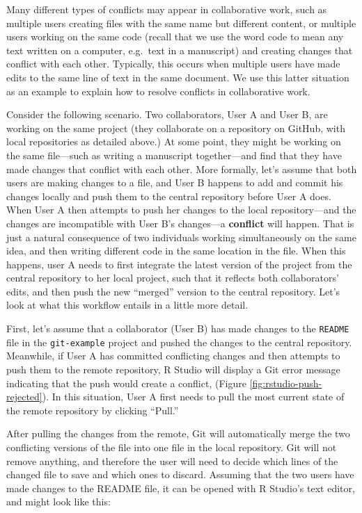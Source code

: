 \documentclass[
  american,
  ,doc,floatsintext]{apa6}
\begin{document}
Many different types of conflicts may appear in collaborative work, such as multiple users creating files with the same name but different content, or multiple users working on the same code (recall that we use the word code to mean any text written on a computer, e.g.~text in a manuscript) and creating changes that conflict with each other. Typically, this occurs when multiple users have made edits to the same line of text in the same document. We use this latter situation as an example to explain how to resolve conflicts in collaborative work.

Consider the following scenario. Two collaborators, User A and User B, are working on the same project (they collaborate on a repository on GitHub, with local repositories as detailed above.) At some point, they might be working on the same file---such as writing a manuscript together---and find that they have made changes that conflict with each other. More formally, let's assume that both users are making changes to a file, and User B happens to add and commit his changes locally and push them to the central repository before User A does. When User A then attempts to push her changes to the local repository---and the changes are incompatible with User B's changes---a \textbf{conflict} will happen. That is just a natural consequence of two individuals working simultaneously on the same idea, and then writing different code in the same location in the file. When this happens, user A needs to first integrate the latest version of the project from the central repository to her local project, such that it reflects both collaborators' edits, and then push the new ``merged'' version to the central repository. Let's look at what this workflow entails in a little more detail.

First, let's assume that a collaborator (User B) has made changes to the \texttt{README} file in the \texttt{git-example} project and pushed the changes to the central repository. Meanwhile, if User A has committed conflicting changes and then attempts to push them to the remote repository, R Studio will display a Git error message indicating that the push would create a conflict, (Figure \ref{fig:rstudio-push-rejected}). In this situation, User A first needs to pull the most current state of the remote repository by clicking ``Pull.''

After pulling the changes from the remote, Git will automatically merge the two conflicting versions of the file into one file in the local repository. Git will not remove anything, and therefore the user will need to decide which lines of the changed file to save and which ones to discard. Assuming that the two users have made changes to the README file, it can be opened with R Studio's text editor, and might look like this:
\end{document}
